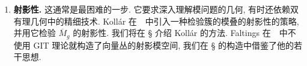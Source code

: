 \begin{enumerate}[步骤 1: ]
\begin{itemize}
映射 $\mathcal M\to M$ 不再在 $\mathbb C$-点上给出双射, 因为它等同闭包相交的点, 其方式与 GIT 中轨道闭包等价关系类似. 但 $\mathcal M\to M$ 确实在 $\mathcal M$ 的闭 $\mathbb C$-点(有时称为多重稳定对象)与 $M$ 的 $\mathbb C$-点之间诱导双射, 而且仍满足到代数空间的映射的万有性质.
\end{itemize}

\item\textbf{射影性.} 这通常是最困难的一步. 它要求深入理解模问题的几何, 有时还依赖双有理几何中的精细技术. Kollár 在~\cite{Kol90}~中引入一种检验簇的模叠的射影性的策略, 并用它检验 $\overline M_g$ 的射影性. 我们将在 \S{} 介绍 Kollár 的方法. Faltings 在~\cite{Fal93}~中不使用 GIT 理论就构造了向量丛的射影模空间, 我们在 \S{} 的构造中借鉴了他的若干思想.
\end{enumerate}
